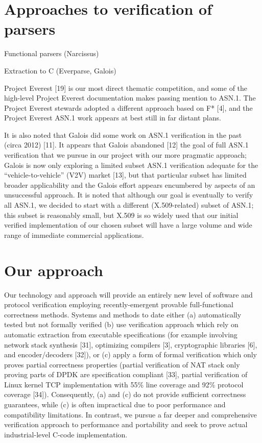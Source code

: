 \documentclass{article}
\begin{document}
\section{Approaches to verification of parsers}

  Functional parsers (Narcissus)

  Extraction to C (Everparse, Galois)

  Project Everest [19] is our most direct thematic competition, and some of the high-level Project Everest documentation makes passing mention to ASN.1. The Project Everest stewards adopted a different approach based on F* [4], and the Project Everest ASN.1 work  appears at best still in far distant plans.

It is also noted that Galois did some work on ASN.1 verification in the past (circa 2012) [11]. It appears that Galois abandoned [12] the goal of full ASN.1 verification that we pursue in our project with our more pragmatic approach; Galois is now only exploring a limited subset ASN.1 verification adequate for the “vehicle-to-vehicle” (V2V) market [13], but that particular subset has limited broader applicability and the Galois effort appears encumbered by aspects of an unsuccessful  approach. It is noted that although our goal is eventually to verify all ASN.1, we decided to start with a different (X.509-related) subset of ASN.1; this subset is reasonably small, but X.509 is so widely used that our initial verified implementation of our chosen subset will have a large volume and wide range of immediate commercial applications.

\section{Our approach}
  Our technology and approach will provide an entirely new level of software and protocol verification employing recently-emergent provable full-functional correctness methods.
Systems and methods to date either (a) automatically tested but not formally verified (b) use verification approach which rely on automatic extraction from executable specifications (for example involving network stack synthesis [31], optimizing compilers [3], cryptographic libraries [6], and encoder/decoders [32]), or (c) apply a form of formal verification which only proves partial correctness properties (partial verification of NAT stack only proving parts of DPDK are specification compliant [33], partial verification of Linux kernel TCP implementation with 55\% line coverage and 92\% protocol coverage [34]). Consequently, (a) and (c) do not provide sufficient correctness guarantees, while (c) is often impractical due to poor performance and compatibility limitations. In contrast, we pursue a far deeper and comprehensive verification approach to performance and portability and seek to prove actual industrial-level C-code implementation.
  
\end{document}
